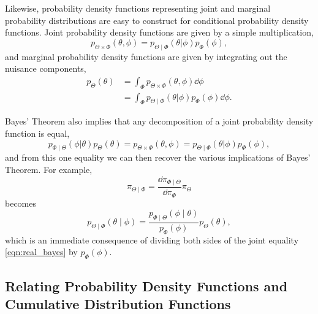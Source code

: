 Likewise, probability density functions representing joint and marginal 
probability distributions are easy to construct for conditional probability 
density functions.  Joint probability density functions are given by a simple
multiplication,
%
\begin{equation*}
p_{\Theta \times \Phi} \! \left( \theta, \phi \right) = 
p_{\Theta \mid \Phi} \! \left( \theta | \phi \right) p_{\Phi} \! \left( \phi \right),
\end{equation*}
%
and marginal probability density functions are given by integrating out the
nuisance components,
%
\begin{align*}
p_{\Theta} \! \left( \theta \right)
&= 
\int_{\Phi} p_{\Theta \times \Phi} \! \left( \theta, \phi \right) \dd \phi \\
&=
\int_{\Phi}
p_{\Theta \mid \Phi} \! \left( \theta | \phi \right) 
p_{\Phi} \! \left( \phi \right) \dd \phi.
\end{align*}

Bayes' Theorem also implies that any decomposition of a joint probability
density function is equal,
%
\begin{equation} \label{eqn:real_bayes}
p_{\Phi \mid \Theta} \! \left( \phi | \theta \right) p_{\Theta} \! \left( \theta \right)
=
p_{\Theta \times \Phi} \! \left( \theta, \phi \right) 
= 
p_{\Theta \mid \Phi} \! \left( \theta | \phi \right) p_{\Phi} \! \left( \phi \right),
\end{equation}
%
and from this one equality we can then recover the various implications of
Bayes' Theorem.  For example,
%
\begin{equation*}
\pi_{\Theta \mid \Phi} =
\frac{ \dd \pi_{\Phi \mid \Theta} }{ \dd \pi_{\Phi} }
\pi_{\Theta}
\end{equation*}
%
becomes
%
\begin{equation*}
p_{\Theta \mid \Phi} \! \left( \theta \mid \phi \right) =
\frac{ p_{\Phi \mid \Theta} \! \left( \phi \mid \theta \right) }
{ p_{\Phi} \! \left( \phi \right) }
p_{\Theta} \! \left( \theta \right),
\end{equation*}
%
which is an immediate consequence of dividing both sides of the joint
equality \eqref{eqn:real_bayes} by $p_{\Phi} \! \left( \phi \right)$.

\subsection{Relating Probability Density Functions and Cumulative 
Distribution Functions}

